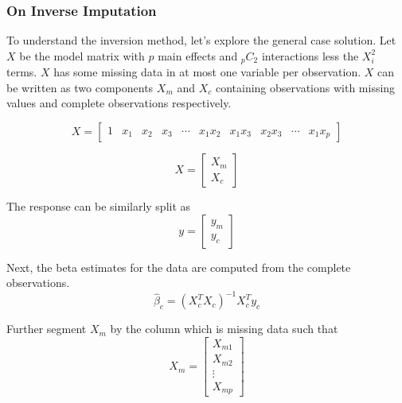 \documentclass[../../paper.tex]{subfiles}
\begin{document}
\subsubsection{On Inverse Imputation}
To understand the inversion method, let's explore the general case solution.
Let $X$ be the model matrix with $p$ main effects and ${}_{p}C_{2}$ interactions less the $X_{i}^2$ terms.
$X$ has some missing data in at most one variable per observation. $X$ can be
written as two components $X_{m}$ and $X_{c}$ containing observations with
 missing values and complete observations respectively.

\begin{equation}
  X =
  \begin{bmatrix}
  1 & x_{1} & x_{2} & x_{3} & \cdots & x_{1}x_{2} & x_{1}x_{3} & x_{2}x_{3} & \cdots & x_{1}x_{p} %
\end{bmatrix}
\end{equation}


\begin{equation}
  X = \begin{bmatrix}
  X_{m} \\
  X_{c}
\end{bmatrix}
\end{equation}

The response can be similarly split as
\begin{equation}
  y = \begin{bmatrix}
  y_{m} \\
  y_{c}
\end{bmatrix}
\end{equation}




Next, the beta estimates for the data are computed from the complete observations.
\begin{equation}
  \hat{\beta}_{c} = (X_{c}^{T}X_{c})^{-1} X_{c}^{T} y_{c}
\end{equation}

Further segment $X_{m}$ by the column which is missing data such that
\begin{equation}
  X_{m} =
\begin{bmatrix}
  X_{m1} \\
  X_{m2} \\
  \vdots \\
  X_{mp}
\end{bmatrix}
\end{equation}
\end{document}
